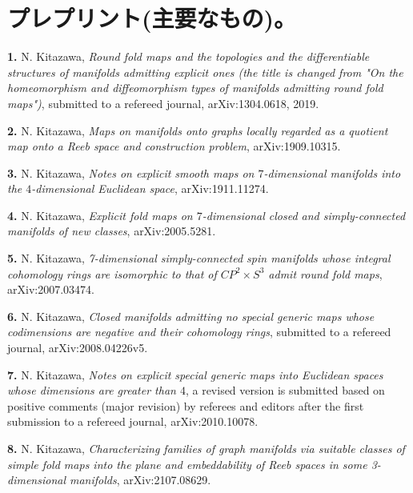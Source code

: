 \documentclass{article}
\begin{document}
\section{プレプリント(主要なもの)。}
{\bf 1.} 
N. Kitazawa, \textsl{Round fold maps and the topologies and the differentiable structures of manifolds admitting explicit ones {\rm (}the title is changed from "On the homeomorphism and diffeomorphism types of manifolds admitting round fold maps"{\rm )}}, submitted to a refereed journal, arXiv:1304.0618, 2019.

\par\noindent
{\bf 2.} N. Kitazawa, \textsl{Maps on manifolds onto graphs locally regarded as a quotient map onto a Reeb space and construction problem}, arXiv:1909.10315.

\par\noindent
{\bf 3.} N. Kitazawa, \textsl{Notes on explicit smooth maps on $7$-dimensional manifolds into the $4$-dimensional Euclidean space}, arXiv:1911.11274. 

\par\noindent
{\bf 4.} N. Kitazawa, \textsl{Explicit fold maps on $7$-dimensional closed and simply-connected manifolds of new classes},  arXiv:2005.5281.

\par\noindent
{\bf 5.} N. Kitazawa, \textsl{7-dimensional simply-connected spin manifolds whose integral cohomology rings are isomorphic to that of $CP^2 \times S^3$ admit round fold maps}, arXiv:2007.03474.

\par\noindent
{\bf 6.} N. Kitazawa, \textsl{Closed manifolds admitting no special generic maps whose codimensions are negative and their cohomology rings}, submitted to a refereed journal, arXiv:2008.04226v5.

\par\noindent
{\bf 7.} N. Kitazawa, \textsl{Notes on explicit special generic maps into Euclidean spaces whose dimensions are greater than $4$}, a revised version is submitted based on positive comments (major revision) by referees and editors after the first submission to a refereed journal, arXiv:2010.10078.

\par\noindent
{\bf 8.} N. Kitazawa, \textsl{Characterizing families of graph manifolds via suitable classes of simple fold maps into the plane and embeddability of Reeb spaces in some 3-dimensional manifolds}, arXiv:2107.08629.
\end{document}
